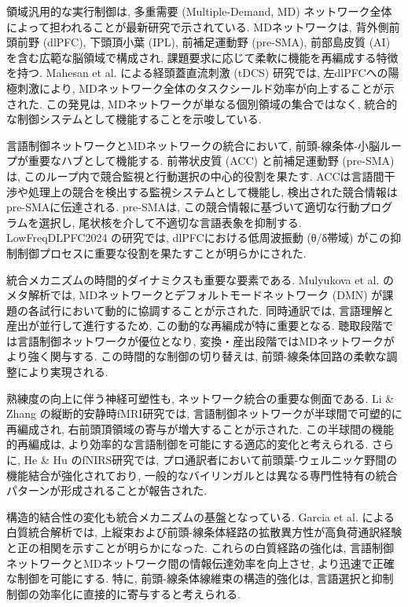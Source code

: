 領域汎用的な実行制御は, 多重需要 (Multiple-Demand, MD) ネットワーク全体によって担われることが最新研究で示されている.
MDネットワークは, 背外側前頭前野 (dlPFC), 下頭頂小葉 (IPL), 前補足運動野 (pre-SMA), 前部島皮質 (AI) を含む広範な脳領域で構成され, 課題要求に応じて柔軟に機能を再編成する特徴を持つ.
Mahesan et al. \cite{Mahesan2023} による経頭蓋直流刺激 (tDCS) 研究では, 左dlPFCへの陽極刺激により, MDネットワーク全体のタスクシールド効率が向上することが示された.
この発見は, MDネットワークが単なる個別領域の集合ではなく, 統合的な制御システムとして機能することを示唆している.

言語制御ネットワークとMDネットワークの統合において, 前頭-線条体-小脳ループが重要なハブとして機能する.
前帯状皮質 (ACC) と前補足運動野 (pre-SMA) は, このループ内で競合監視と行動選択の中心的役割を果たす.
ACCは言語間干渉や処理上の競合を検出する監視システムとして機能し, 検出された競合情報はpre-SMAに伝達される.
pre-SMAは, この競合情報に基づいて適切な行動プログラムを選択し, 尾状核を介して不適切な言語表象を抑制する.
LowFreqDLPFC2024 \cite{LowFreqDLPFC2024} の研究では, dlPFCにおける低周波振動 (θ/δ帯域) がこの抑制制御プロセスに重要な役割を果たすことが明らかにされた.

統合メカニズムの時間的ダイナミクスも重要な要素である.
Mulyukova et al. \cite{MDN_DMN2023} のメタ解析では, MDネットワークとデフォルトモードネットワーク (DMN) が課題の各試行において動的に協調することが示された.
同時通訳では, 言語理解と産出が並行して進行するため, この動的な再編成が特に重要となる.
聴取段階では言語制御ネットワークが優位となり, 変換・産出段階ではMDネットワークがより強く関与する.
この時間的な制御の切り替えは, 前頭-線条体回路の柔軟な調整により実現される.

熟練度の向上に伴う神経可塑性も, ネットワーク統合の重要な側面である.
Li \& Zhang \cite{Li2025} の縦断的安静時fMRI研究では, 言語制御ネットワークが半球間で可塑的に再編成され, 右前頭頂領域の寄与が増大することが示された.
この半球間の機能的再編成は, より効率的な言語制御を可能にする適応的変化と考えられる.
さらに, He \& Hu \cite{He2022} のfNIRS研究では, プロ通訳者において前頭葉-ウェルニッケ野間の機能結合が強化されており, 一般的なバイリンガルとは異なる専門性特有の統合パターンが形成されることが報告された.

構造的結合性の変化も統合メカニズムの基盤となっている.
Garcia et al. \cite{WhiteMatter2024} による白質統合解析では, 上縦束および前頭-線条体経路の拡散異方性が高負荷通訳経験と正の相関を示すことが明らかになった.
これらの白質経路の強化は, 言語制御ネットワークとMDネットワーク間の情報伝達効率を向上させ, より迅速で正確な制御を可能にする.
特に, 前頭-線条体線維束の構造的強化は, 言語選択と抑制制御の効率化に直接的に寄与すると考えられる.

